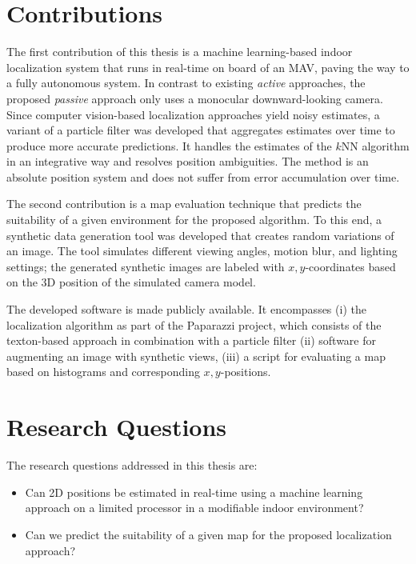 \documentclass{report}
\begin{document}
\section{Contributions}
\label{sec:contributions}

The first contribution of this thesis is a machine learning-based
indoor localization system that runs in real-time on board of an MAV,
paving the way to a fully autonomous system. In contrast to existing
\emph{active} approaches, the proposed \emph{passive} approach only
uses a monocular downward-looking camera. Since computer vision-based
localization approaches yield noisy estimates, a variant of a particle
filter was developed that aggregates estimates over time to produce
more accurate predictions. It handles the estimates of the $k$NN
algorithm in an integrative way and resolves position ambiguities. The
method is an absolute position system and does not suffer from error
accumulation over time.

The second contribution is a map evaluation technique that predicts
the suitability of a given environment for the proposed algorithm. To
this end, a synthetic data generation tool was developed that creates
random variations of an image. The tool simulates different viewing
angles, motion blur, and lighting settings; the generated synthetic
images are labeled with $x,y$-coordinates based on the 3D position of
the simulated camera model.

The developed software is made publicly available. It encompasses (i)
the localization algorithm as part of the Paparazzi project, which
consists of the texton-based approach in combination with a particle
filter (ii) software for augmenting an image with synthetic views,
(iii) a script for evaluating a map based on histograms and
corresponding $x,y$-positions.


\section{Research Questions}
\label{sec:researchquestions}

The research questions addressed in this thesis are:

\begin{itemize}
\item Can 2D positions be estimated in real-time using a machine
  learning approach on a limited processor in a modifiable indoor
  environment?
\item Can we predict the suitability of a given map for the proposed
  localization approach?
\end{itemize}
\end{document}
